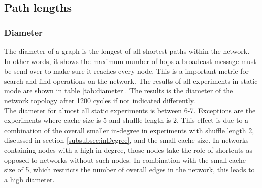 \subsection{Path lengths}
\subsubsection{Diameter}
\label{subsubsec:diameter}
The diameter of a graph is the longest of all shortest paths within the network.
In other words, it shows the maximum number of hops a broadcast message must be
send over to make sure it reaches every node. This is a important metric for
search and find operations on the network. The results of all experiments in
static mode are shown in table \ref{tab:diameter}. The results is the
diameter of the network topology after 1200 cycles if not indicated
differently.\\
The diameter for almost all static experiments is between 6-7. Exceptions are
the experiments where cache size is 5 and shuffle length is 2. This effect
is due to a combination of the overall smaller in-degree in experiments with
shuffle length 2, discussed in section \ref{subsubsec:inDegree}, and the small
cache size. In networks containing nodes with a high in-degree, those nodes take
the role of shortcuts as opposed to networks without such nodes. In combination
with the small cache size of 5, which restricts the number of overall edges in
the network, this leads to a high diameter.  


